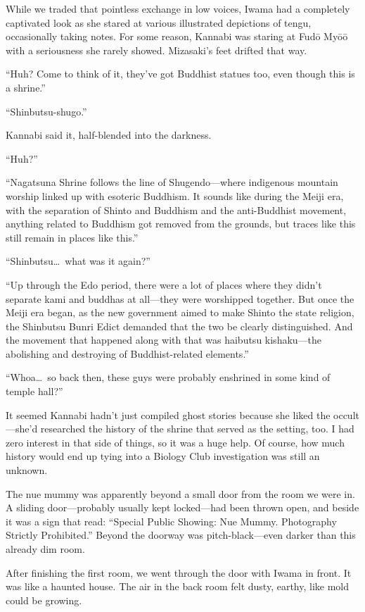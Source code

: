 \documentclass[
    a4paper,
    12pt,
    twoside,
    openany,
    UTF8,
    fontset=windows
]{ctexbook}
\begin{document}
While we traded that pointless exchange in low voices, Iwama had a completely captivated look as she stared at various illustrated depictions of tengu, occasionally taking notes. For some reason, Kannabi was staring at Fud\=o My\=o\=o with a seriousness she rarely showed. Mizasaki's feet drifted that way.


``Huh? Come to think of it, they've got Buddhist statues too, even though this is a shrine.''

``Shinbutsu-shugo.''

Kannabi said it, half-blended into the darkness.

``Huh?''

``Nagatsuna Shrine follows the line of Shugendo---where indigenous mountain worship linked up with esoteric Buddhism. It sounds like during the Meiji era, with the separation of Shinto and Buddhism and the anti-Buddhist movement, anything related to Buddhism got removed from the grounds, but traces like this still remain in places like this.''

``Shinbutsu\dots\ what was it again?''

``Up through the Edo period, there were a lot of places where they didn't separate kami and buddhas at all---they were worshipped together. But once the Meiji era began, as the new government aimed to make Shinto the state religion, the Shinbutsu Bunri Edict demanded that the two be clearly distinguished. And the movement that happened along with that was haibutsu kishaku---the abolishing and destroying of Buddhist-related elements.''

``Whoa\dots\ so back then, these guys were probably enshrined in some kind of temple hall?''

It seemed Kannabi hadn't just compiled ghost stories because she liked the occult---she'd researched the history of the shrine that served as the setting, too. I had zero interest in that side of things, so it was a huge help. Of course, how much history would end up tying into a Biology Club investigation was still an unknown.

The nue mummy was apparently beyond a small door from the room we were in. A sliding door---probably usually kept locked---had been thrown open, and beside it was a sign that read: ``Special Public Showing: Nue Mummy. Photography Strictly Prohibited.'' Beyond the doorway was pitch-black---even darker than this already dim room.

After finishing the first room, we went through the door with Iwama in front. It was like a haunted house. The air in the back room felt dusty, earthy, like mold could be growing.
\end{document}

